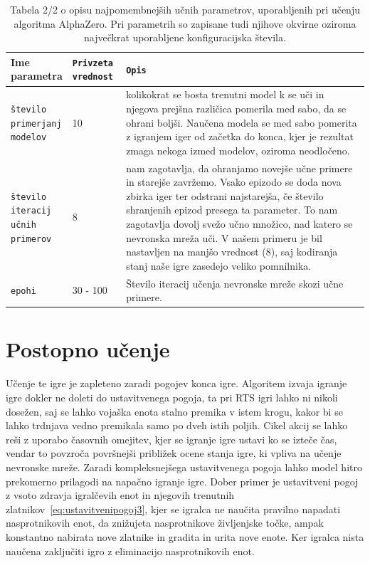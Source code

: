 \documentclass[a4paper, 12pt]{book}
\begin{document}
\begin{table}
	\begin{center}
		\begin{tabular}{p{0.15\linewidth}|p{0.15\linewidth}|p{0.7\linewidth}}
			Ime parametra                             & {\tt Privzeta vrednost} & {\tt Opis} \\ \hline

			{\tt število primerjanj modelov}  		  & 10 						& kolikokrat se bosta trenutni model k se uči in njegova prejšna različica pomerila med sabo, da se ohrani boljši.
																				  Naučena modela se med sabo pomerita z igranjem iger od začetka do konca, kjer je rezultat zmaga nekoga izmed modelov, oziroma neodločeno.\\
			{\tt število iteracij učnih primerov}     & 8 						& nam zagotavlja, da ohranjamo novejše učne primere in starejše zavržemo.
																				  Vsako epizodo se doda nova zbirka iger ter odstrani najstarejša, če število shranjenih epizod presega ta parameter.
																				  To nam zagotavlja dovolj svežo učno množico, nad katero se nevronska mreža uči.
																				  V našem primeru je bil nastavljen na manjšo vrednost (8), saj kodiranja stanj naše igre zasedejo veliko pomnilnika.\\
			{\tt epohi}     						  & 30 - 100 					& Število iteracij učenja nevronske mreže skozi učne primere.\\
		\end{tabular}
	\end{center}
	\caption{Tabela 2/2 o opisu najpomembnejših učnih parametrov, uporabljenih pri učenju algoritma AlphaZero. Pri parametrih so zapisane tudi njihove okvirne oziroma največkrat uporabljene konfiguracijska števila.}
	\label{tableParameters2}
\end{table}



\section{Postopno učenje}
Učenje te igre je zapleteno zaradi pogojev konca igre. 
Algoritem izvaja igranje igre dokler ne doleti do ustavitvenega pogoja, ta pri RTS igri lahko ni nikoli dosežen, saj se lahko vojaška enota stalno premika v istem krogu, kakor bi se lahko trdnjava vedno premikala samo po dveh istih poljih.
Cikel akcij se lahko reši z uporabo časovnih omejitev, kjer se igranje igre ustavi ko se izteče čas, vendar to povzroča površnejši približek ocene stanja igre, ki vpliva na učenje nevronske mreže.
Zaradi kompleksnejšega ustavitvenega pogoja lahko model hitro prekomerno prilagodi na napačno igranje igre.
Dober primer je ustavitveni pogoj z vsoto zdravja igralčevih enot in njegovih trenutnih zlatnikov~\ref{eq:ustavitvenipogoj3}, kjer se igralca ne naučita pravilno napadati nasprotnikovih enot, da znižujeta nasprotnikove življenjske točke, ampak konstantno nabirata nove zlatnike in gradita in urita nove enote.
Ker igralca nista naučena zaključiti igro z eliminacijo nasprotnikovih enot.
\end{document}
